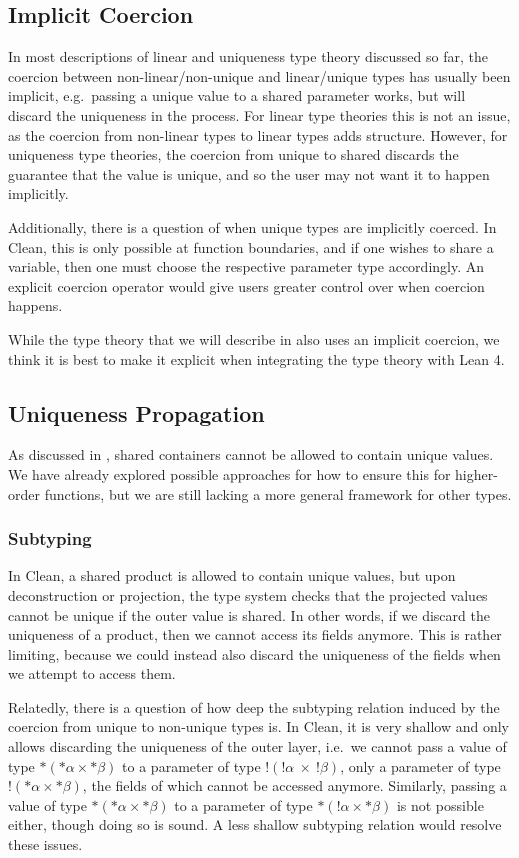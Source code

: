 \subsection{Implicit Coercion}\label{sec:coercions}
In most descriptions of linear and uniqueness type theory discussed so far, the coercion between non-linear/non-unique and linear/unique types has usually been implicit, e.g.\ passing a unique value to a shared parameter works, but will discard the uniqueness in the process. For linear type theories this is not an issue, as the coercion from non-linear types to linear types adds structure. However, for uniqueness type theories, the coercion from unique to shared discards the guarantee that the value is unique, and so the user may not want it to happen implicitly. 

Additionally, there is a question of when unique types are implicitly coerced. In Clean, this is only possible at function boundaries, and if one wishes to share a variable, then one must choose the respective parameter type accordingly. An explicit coercion operator would give users greater control over when coercion happens.

While the type theory that we will describe in  also uses an implicit coercion, we think it is best to make it explicit when integrating the type theory with Lean 4.

\subsection{Uniqueness Propagation}
As discussed in , shared containers cannot be allowed to contain unique values. We have already explored possible approaches for how to ensure this for higher-order functions, but we are still lacking a more general framework for other types.

\subsubsection{Subtyping}
In Clean, a shared product is allowed to contain unique values, but upon deconstruction or projection, the type system checks that the projected values cannot be unique if the outer value is shared. In other words, if we discard the uniqueness of a product, then we cannot access its fields anymore. This is rather limiting, because we could instead also discard the uniqueness of the fields when we attempt to access them. 

Relatedly, there is a question of how deep the subtyping relation induced by the coercion from unique to non-unique types is. In Clean, it is very shallow and only allows discarding the uniqueness of the outer layer, i.e.\ we cannot pass a value of type $*(*\alpha \times *\beta)$ to a parameter of type $!(!\alpha\ \times\ !\beta)$, only a parameter of type $!(*\alpha \times *\beta)$, the fields of which cannot be accessed anymore. Similarly, passing a value of type $*(*\alpha \times *\beta)$ to a parameter of type $*(!\alpha \times *\beta)$ is not possible either, though doing so is sound. A less shallow subtyping relation would resolve these issues.

